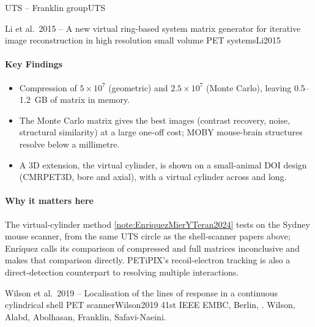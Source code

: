 \begin{programnote}{UTS -- Franklin group}{UTS}
\begin{papernote}{Li et al.\ 2015 -- A new virtual ring-based system matrix generator for iterative image reconstruction in high resolution small volume PET systems}{Li2015}
\paragraph{Key Findings}
\begin{itemize}
	\item Compression of $5 \times 10^{7}$ (geometric) and
		$2.5 \times 10^{7}$ (Monte Carlo), leaving 0.5--\qty{1.2}{GB} of
		matrix in memory.
	\item The Monte Carlo matrix gives the best images (contrast recovery,
		noise, structural similarity) at a large one-off cost; MOBY mouse-brain
		structures resolve below a millimetre.
	\item A 3D extension, the virtual cylinder, is shown on a small-animal DOI
		design (CMRPET3D,  bore and  axial), with a virtual
		cylinder  across and  long.
\end{itemize}

\paragraph{Why it matters here}
The virtual-cylinder method \ref{note:EnriquezMierYTeran2024} tests on the
Sydney mouse scanner, from the same UTS circle as the shell-scanner papers
above; Enríquez calls its comparison of compressed and full matrices
inconclusive and makes that comparison directly. PETiPIX's recoil-electron tracking is also a direct-detection
counterpart to resolving multiple interactions.
\end{papernote}

\begin{papernote}{Wilson et al.\ 2019 -- Localisation of the lines of response in a continuous cylindrical shell PET scanner}{Wilson2019}
41st IEEE EMBC, Berlin, . Wilson, Alabd,
Abolhasan, Franklin, Safavi-Naeini.


\end{papernote}
\end{programnote}
